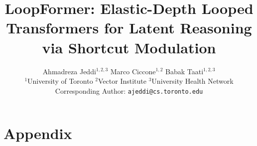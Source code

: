 \documentclass{article} %
\title{LoopFormer: Elastic-Depth Looped Transformers for Latent Reasoning via Shortcut Modulation}
\author{
Ahmadreza Jeddi$^{1,2,3}$ \quad
Marco Ciccone$^{1,2}$ \quad
Babak Taati$^{1,2,3}$ \\
\vspace{0.2em}
$^{1}$University of Toronto \quad
$^{2}$Vector Institute \quad
$^{3}$University Health Network \\
\vspace{0.2em}
 Corresponding Author: \texttt{ajeddi@cs.toronto.edu}\quad
}
\begin{document}
\maketitle





  










\newpage
\appendix
\section*{Appendix}

\end{document}
